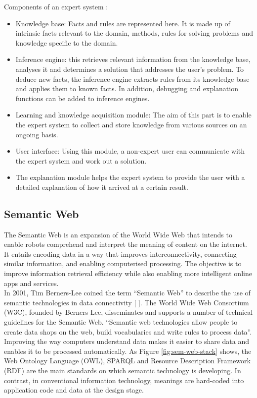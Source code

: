 Components of an expert system : 
\begin{itemize}
    \item Knowledge base: Facts and rules are represented here. It is made up of intrinsic facts relevant to the domain, methods, rules for solving problems and knowledge specific to the domain.
    \item Inference engine: this retrieves relevant information from the knowledge base, analyses it and determines a solution that addresses the user's problem. To deduce new facts, the inference engine extracts rules from its knowledge base and applies them to known facts. In addition, debugging and explanation functions can be added to inference engines.
    \item Learning and knowledge acquisition module: The aim of this part is to enable the expert system to collect and store knowledge from various sources on an ongoing basis.
    \item User interface: Using this module, a non-expert user can communicate with the expert system and work out a solution.
    \item The explanation module helps the expert system to provide the user with a detailed explanation of how it arrived at a certain result.
\end{itemize}


\subsection{Semantic Web\label{sec:semweb}}
The Semantic Web is an expansion of the World Wide Web that intends to enable robots comprehend and interpret the meaning of content on the internet. It entails encoding data in a way that improves interconnectivity, connecting similar information, and enabling computerised processing. The objective is to improve information retrieval efficiency while also enabling more intelligent online apps and services.\\

In 2001, Tim Berners-Lee coined the term “Semantic Web” to describe the use of semantic technologies in data connectivity [ ]. The World Wide Web Consortium (W3C), founded by Berners-Lee, disseminates and supports a number of technical guidelines for the Semantic Web. “Semantic web technologies allow people to create data shops on the web, build vocabularies and write rules to process data”.\\

Improving the way computers understand data makes it easier to share data and enables it to be processed automatically. As Figure \ref{fig:sem-web-stack} shows, the Web Ontology Language (OWL), SPARQL and Resource Description Framework (RDF) are the main standards on which semantic technology is developing. In contrast, in conventional information technology, meanings are hard-coded into application code and data at the design stage. \\

